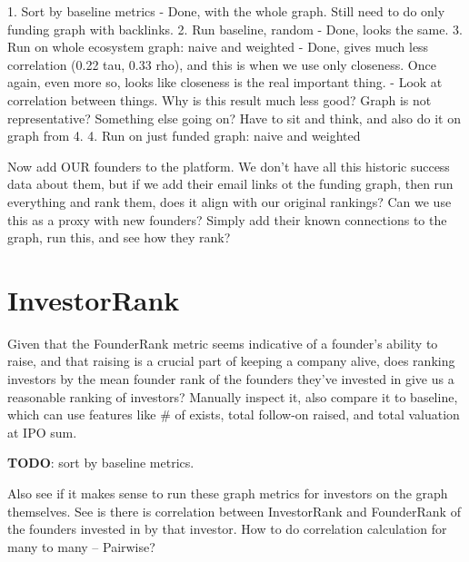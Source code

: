 1. Sort by baseline metrics
  - Done, with the whole graph. Still need to do only funding graph with backlinks.
2. Run baseline, random
  - Done, looks the same.
3. Run on whole ecosystem graph: naive and weighted
  - Done, gives much less correlation (0.22 tau, 0.33 rho), and this is when we use only closeness. Once again, even more so, looks like closeness is the real important thing.
  - Look at correlation between things. Why is this result much less good? Graph is not representative? Something else going on? Have to sit and think, and also do it on graph from 4.
4. Run on just funded graph: naive and weighted


Now add OUR founders to the platform. We don't have all this historic success data about them, but if we add their email links ot the funding graph, then run everything and rank them, does it align with our original rankings? Can we use this as a proxy with new founders? Simply add their known connections to the graph, run this, and see how they rank?

\section{InvestorRank}

Given that the FounderRank metric seems indicative of a founder's ability to raise, and that raising is a crucial part of keeping a company alive, does ranking investors by the mean founder rank of the founders they've invested in give us a reasonable ranking of investors? Manually inspect it, also compare it to baseline, which can use features like \# of exists, total follow-on raised, and total valuation at IPO sum.

\textbf{TODO}: sort by baseline metrics.

Also see if it makes sense to run these graph metrics for investors on the graph themselves. See is there is correlation between InvestorRank and FounderRank of the founders invested in by that investor. How to do correlation calculation for many to many -- Pairwise?
